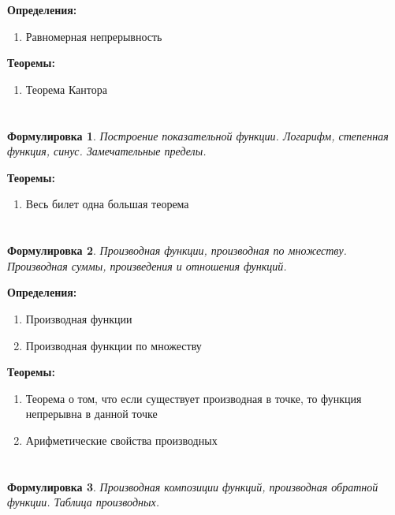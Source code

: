 \documentclass[a4paper]{article}
\theoremstyle{plain}
\newtheorem*{st}{Формулировка}
\theoremstyle{definition}
\theoremstyle{remark}
\begin{document}
\textbf{Определения:}
\begin{enumerate}
    \item Равномерная непрерывность
\end{enumerate}

\textbf{Теоремы:}
\begin{enumerate}
    \item Теорема Кантора
\end{enumerate}


\section{}
\begin{st}
    Построение показательной функции. Логарифм, степенная функция, синус. Замечательные пределы.
\end{st}

\textbf{Теоремы:}
\begin{enumerate}
    \item Весь билет одна большая теорема
\end{enumerate}


\section{}
\begin{st}
    Производная функции, производная по множеству. Производная суммы, произведения и отношения функций.
\end{st}

\textbf{Определения:}
\begin{enumerate}
    \item Производная функции
    \item Производная функции по множеству
\end{enumerate}

\textbf{Теоремы:}
\begin{enumerate}
    \item Теорема о том, что если существует производная в точке, то функция непрерывна в данной точке
    \item Арифметические свойства производных
\end{enumerate}


\section{}
\begin{st}
    Производная композиции функций, производная обратной функции. Таблица производных.
\end{st}
\end{document}
